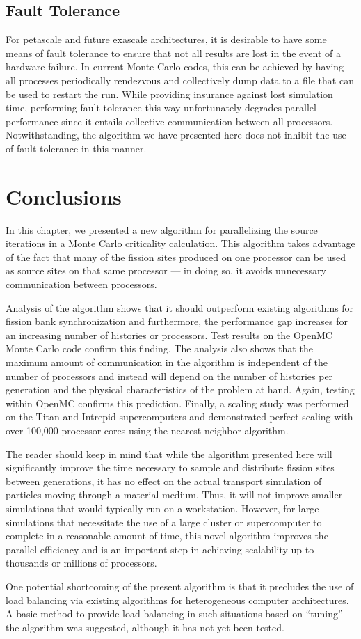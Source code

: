 \subsection{Fault Tolerance}

For petascale and future exascale architectures, it is desirable to have some
means of fault tolerance to ensure that not all results are lost in the event of
a hardware failure. In current Monte Carlo codes, this can be achieved by having
all processes periodically rendezvous and collectively dump data to a file that
can be used to restart the run. While providing insurance against lost
simulation time, performing fault tolerance this way unfortunately degrades
parallel performance since it entails collective communication between all
processors. Notwithstanding, the algorithm we have presented here does not
inhibit the use of fault tolerance in this manner.

\section{Conclusions}
\label{sec:conclusions}

In this chapter, we presented a new algorithm for parallelizing the source
iterations in a Monte Carlo criticality calculation. This algorithm takes
advantage of the fact that many of the fission sites produced on one processor
can be used as source sites on that same processor --- in doing so, it avoids
unnecessary communication between processors.

Analysis of the algorithm shows that it should outperform existing algorithms
for fission bank synchronization and furthermore, the performance gap increases
for an increasing number of histories or processors. Test results on the OpenMC
Monte Carlo code confirm this finding. The analysis also shows that the maximum
amount of communication in the algorithm is independent of the number of
processors and instead will depend on the number of histories per generation and
the physical characteristics of the problem at hand. Again, testing within
OpenMC confirms this prediction. Finally, a scaling study was performed on the
Titan and Intrepid supercomputers and demonstrated perfect scaling with over
100,000 processor cores using the nearest-neighbor algorithm.

The reader should keep in mind that while the algorithm presented here will
significantly improve the time necessary to sample and distribute fission sites
between generations, it has no effect on the actual transport simulation of
particles moving through a material medium. Thus, it will not improve smaller
simulations that would typically run on a workstation. However, for large
simulations that necessitate the use of a large cluster or supercomputer to
complete in a reasonable amount of time, this novel algorithm improves the
parallel efficiency and is an important step in achieving scalability up to
thousands or millions of processors.

One potential shortcoming of the present algorithm is that it precludes the use
of load balancing via existing algorithms for heterogeneous computer
architectures. A basic method to provide load balancing in such situations based
on ``tuning'' the algorithm was suggested, although it has not yet been tested.

